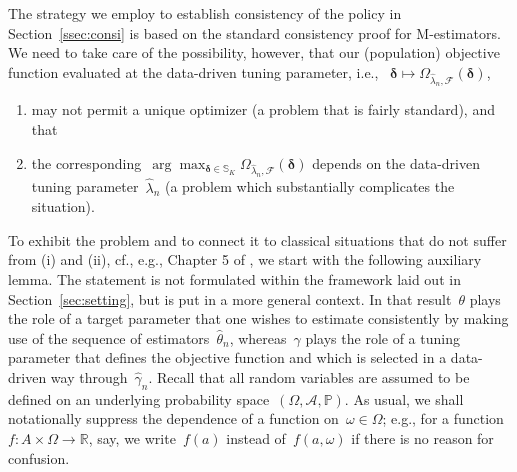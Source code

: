 \documentclass[11pt, a4paper]{article}
\newcommand{\R}{\mathbb{R}}
\theoremstyle{definition}
\begin{document}
The strategy we employ to establish consistency of the policy in Section~\ref{ssec:consi} is based on the standard consistency proof for M-estimators. We need to take care of the possibility, however, that our (population) objective function evaluated at the data-driven tuning parameter, i.e., ~$\bm{\delta} \mapsto \Omega_{  \hat{\lambda}_n, \mathcal{F}}(\bm{\delta})$,
%
\begin{enumerate}[label=(\roman*)]
\item may not permit a unique optimizer (a problem that is fairly standard), and that
\item the corresponding~$\arg\max_{\bm{\delta} \in \mathbb{S}_K} \Omega_{  \hat{\lambda}_n, \mathcal{F}}(\bm{\delta})$ depends on the data-driven tuning parameter~$\hat{\lambda}_n$ (a problem which substantially complicates the situation).
\end{enumerate} 
%
To exhibit the problem and to connect it to classical situations that do not suffer from (i) and (ii), cf., e.g., Chapter 5 of \cite{vdV}, we start with the following auxiliary lemma. The statement is not formulated within the framework laid out in Section~\ref{sec:setting}, but is put in a more general context. In that result~$\theta$ plays the role of a target parameter that one wishes to estimate consistently by making use of the sequence of estimators~$\hat{\theta}_n$, whereas~$\gamma$ plays the role of a tuning parameter that defines the objective function and which is selected in a data-driven way through~$\hat{\gamma}_n$. Recall that all random variables are assumed to be defined on an underlying probability space~$(\Omega, \mathcal{A}, \mathbb{P})$. As usual, we shall notationally suppress the dependence of a function on~$\omega \in \Omega$; e.g., for a function~$f: A \times \Omega \to \R$, say, we write~$f(a)$ instead of~$f(a, \omega)$ if there is no reason for confusion. 
\end{document}
